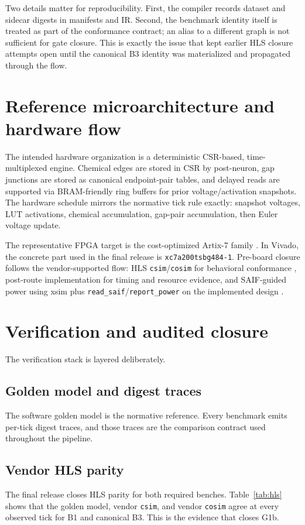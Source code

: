 \documentclass[11pt]{article}
\begin{document}
Two details matter for reproducibility. First, the compiler records dataset and sidecar digests in manifests and IR. Second, the benchmark identity itself is treated as part of the conformance contract; an alias to a different graph is not sufficient for gate closure. This is exactly the issue that kept earlier HLS closure attempts open until the canonical B3 identity was materialized and propagated through the flow.

\section{Reference microarchitecture and hardware flow}
The intended hardware organization is a deterministic CSR-based, time-multiplexed engine. Chemical edges are stored in CSR by post-neuron, gap junctions are stored as canonical endpoint-pair tables, and delayed reads are supported via BRAM-friendly ring buffers for prior voltage/activation snapshots. The hardware schedule mirrors the normative tick rule exactly: snapshot voltages, LUT activations, chemical accumulation, gap-pair accumulation, then Euler voltage update.

The representative FPGA target is the cost-optimized Artix-7 family \cite{amd_artix7}. In Vivado, the concrete part used in the final release is \texttt{xc7a200tsbg484-1}. Pre-board closure follows the vendor-supported flow: HLS \texttt{csim}/\texttt{cosim} for behavioral conformance \cite{amd_ug1399}, post-route implementation for timing and resource evidence, and SAIF-guided power using xsim plus \texttt{read\_saif}/\texttt{report\_power} on the implemented design \cite{amd_ug900,amd_ug907}.

\section{Verification and audited closure}
The verification stack is layered deliberately.

\subsection{Golden model and digest traces}
The software golden model is the normative reference. Every benchmark emits per-tick digest traces, and those traces are the comparison contract used throughout the pipeline.

\subsection{Vendor HLS parity}
The final release closes HLS parity for both required benches. Table~\ref{tab:hls} shows that the golden model, vendor \texttt{csim}, and vendor \texttt{cosim} agree at every observed tick for B1 and canonical B3. This is the evidence that closes G1b.
\end{document}
